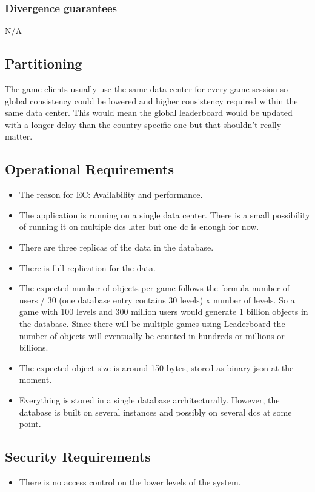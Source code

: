 \documentclass[11pt,a4paper]{report}
\begin{document}
\subsubsection{Divergence guarantees}
N/A

\subsection{Partitioning}
The game clients usually use the same data center for every game session so global consistency could be lowered and higher consistency required within the same data center. This would mean the global leaderboard would be updated with a longer delay than the country-specific one but that shouldn't really matter.


\subsection{Operational Requirements}
\begin{itemize}
\item The reason for EC: Availability and performance.
\item The application is running on a single data center. There is a small possibility of running it on multiple \glspl{dc} later but one \gls{dc} is enough for now.
\item There are three replicas of the data in the database.
\item There is full replication for the data.
\item The expected number of objects per game follows the formula number of users / 30 (one database entry contains 30 levels) x number of levels. So a game with 100 levels and 300 million users would generate 1 billion objects in the database. Since there will be multiple games using Leaderboard the number of objects will eventually be counted in hundreds or millions or billions.
\item The expected object size is around 150 bytes, stored as binary json at the moment.
\item Everything is stored in a single database architecturally. However, the database is built on several instances and possibly on several \glspl{dc} at some point.
\end{itemize}

\subsection{Security Requirements}
\begin{itemize}
\item There is no access control on the lower levels of the system.
\end{itemize}
\end{document}
